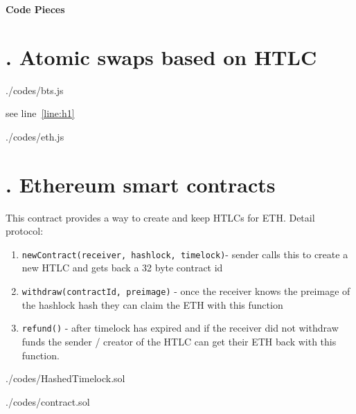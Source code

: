 \begin{huge}
\textbf{Code Pieces}
\end{huge}







\section{\uppercase\expandafter{}. Atomic swaps based on HTLC}

\begin{lstinputlisting}[language=JavaScript,  
						caption=Bitshares side, 	
						firstline = 10, 
						lastline = 50,
						escapechar=@]{./codes/bts.js}
\end{lstinputlisting}
see line~\ref{line:h1}

\begin{lstinputlisting}[language=JavaScript, 
						caption=Ethereum Side, 
						firstline=20,
						lastline=50]{./codes/eth.js}	
\end{lstinputlisting}

\section{\uppercase\expandafter{}. Ethereum smart contracts}

\noindent This contract provides a way to create and keep
HTLCs for ETH. Detail protocol:

\begin{enumerate}
	\item \texttt{newContract(receiver, hashlock, timelock)}- sender calls this to create a new HTLC and gets back a 32 byte contract id
	\item \texttt{withdraw(contractId, preimage)} - once the receiver knows the preimage of the hashlock hash they can claim the ETH with this function
	\item \texttt{refund()} - after timelock has expired and if the receiver did not withdraw funds the sender / creator of the HTLC can get their ETH back with this function.
\end{enumerate}
  

\begin{lstinputlisting}[language=Solidity, 
						firstline = 12, 
						lastline =40, 
						caption = Hashed Timelock Contracts (HTLCs) on Ethereum]{./codes/HashedTimelock.sol}

\end{lstinputlisting}


\begin{lstinputlisting}[language=Solidity, 
						firstline=20, 
						lastline=50, 
						caption= Ethereum micro-payment channel -- Machinomy]{./codes/contract.sol}
	
\end{lstinputlisting}



